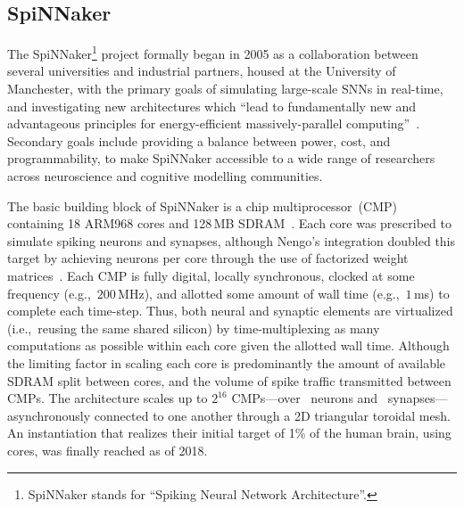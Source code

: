 \subsection{SpiNNaker}

The SpiNNaker\footnote{SpiNNaker stands for ``Spiking Neural Network Architecture''.} project formally began in 2005 as a collaboration between several universities and industrial partners, housed at the University of Manchester, with the primary goals of simulating large-scale SNNs in real-time, and investigating new architectures which ``lead to fundamentally new and advantageous principles for energy-efficient massively-parallel computing''~\citep{spinnakerproject, furber2014spinnaker}.
Secondary goals include providing a balance between power, cost, and programmability, to make SpiNNaker accessible to a wide range of researchers across neuroscience and cognitive modelling communities.

The basic building block of SpiNNaker is a chip multiprocessor~(CMP) containing 18 ARM968 cores and 128\,MB SDRAM~\citep{painkras2013spinnaker, furber2013overview}.
Each core was prescribed to simulate  spiking neurons and  synapses, although Nengo's integration doubled this target by achieving  neurons per core through the use of factorized weight matrices~\citep{mundy2015}.
Each CMP is fully digital, locally synchronous, clocked at some frequency (e.g.,~$200$\,MHz), and allotted some amount of wall time (e.g.,~$1$\,ms) to complete each time-step.
Thus, both neural and synaptic elements are virtualized (i.e.,~reusing the same shared silicon) by time-multiplexing as many computations as possible within each core given the allotted wall time.
Although the limiting factor in scaling each core is predominantly the amount of available SDRAM split between cores, and the volume of spike traffic transmitted between CMPs.
The architecture scales up to $2^{16}$ CMPs---over ~neurons and ~synapses---asynchronously connected to one another through a 2D triangular toroidal mesh.
An instantiation that realizes their initial target of 1\% of the human brain, using  cores, was finally reached as of 2018.

